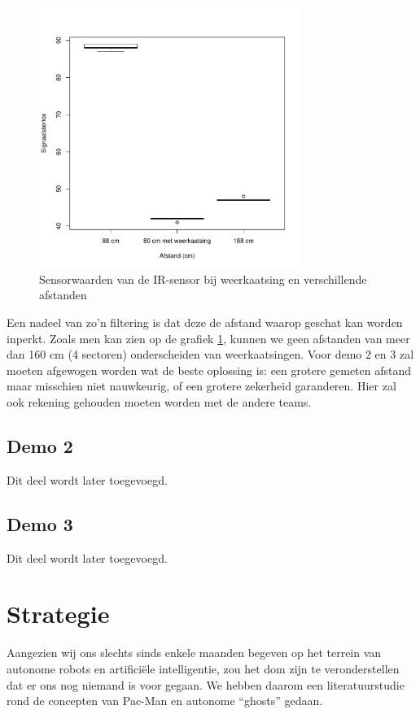 \documentclass[12pt,a4paper]{report}
\begin{document}
\begin{figure}
\begin{center}
 \includegraphics[width=85mm]{./resources/boxplotSpiegeling.pdf}
 \caption{Sensorwaarden van de IR-sensor bij weerkaatsing en verschillende afstanden}
 \label{fig:boxplotSpiegeling}
\end{center}
\end{figure}

Een nadeel van zo'n filtering is dat deze de afstand waarop geschat kan worden inperkt. Zoals men kan zien op de grafiek \ref{fig:boxplotSpiegeling}, kunnen we geen afstanden van meer dan 160 cm (4 sectoren) onderscheiden van weerkaatsingen. Voor demo 2 en 3 zal moeten afgewogen worden wat de beste oplossing is: een grotere gemeten afstand maar misschien niet nauwkeurig, of een grotere zekerheid garanderen. Hier zal ook rekening gehouden moeten worden met de andere teams. 

\section{Demo 2}

Dit deel wordt later toegevoegd.

\section{Demo 3}

Dit deel wordt later toegevoegd.

\chapter{Strategie}

Aangezien wij ons slechts sinds enkele maanden begeven op het terrein van autonome robots en artifici\"ele intelligentie, zou het dom zijn te veronderstellen dat er ons nog niemand is voor gegaan. We hebben daarom een literatuurstudie rond de concepten van Pac-Man en autonome ``ghosts'' gedaan.
\end{document}
